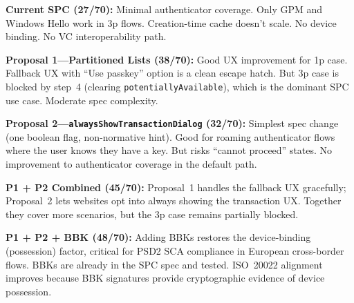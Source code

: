 \documentclass[12pt,a4paper]{article}
\begin{document}
\textbf{Current SPC (27/70):} Minimal authenticator coverage. Only GPM and Windows Hello work in 3p flows. Creation-time cache doesn't scale. No device binding. No VC interoperability path.

\textbf{Proposal 1---Partitioned Lists (38/70):} Good UX improvement for 1p case. Fallback UX with ``Use passkey'' option is a clean escape hatch. But 3p case is blocked by step~4 (clearing \texttt{potentiallyAvailable}), which is the dominant SPC use case. Moderate spec complexity.

\textbf{Proposal 2---\texttt{alwaysShowTransactionDialog} (32/70):} Simplest spec change (one boolean flag, non-normative hint). Good for roaming authenticator flows where the user knows they have a key. But risks ``cannot proceed'' states. No improvement to authenticator coverage in the default path.

\textbf{P1 + P2 Combined (45/70):} Proposal~1 handles the fallback UX gracefully; Proposal~2 lets websites opt into always showing the transaction UX. Together they cover more scenarios, but the 3p case remains partially blocked.

\textbf{P1 + P2 + BBK (48/70):} Adding BBKs restores the device-binding (possession) factor, critical for PSD2 SCA compliance in European cross-border flows. BBKs are already in the SPC spec and tested. ISO~20022 alignment improves because BBK signatures provide cryptographic evidence of device possession.
\end{document}
